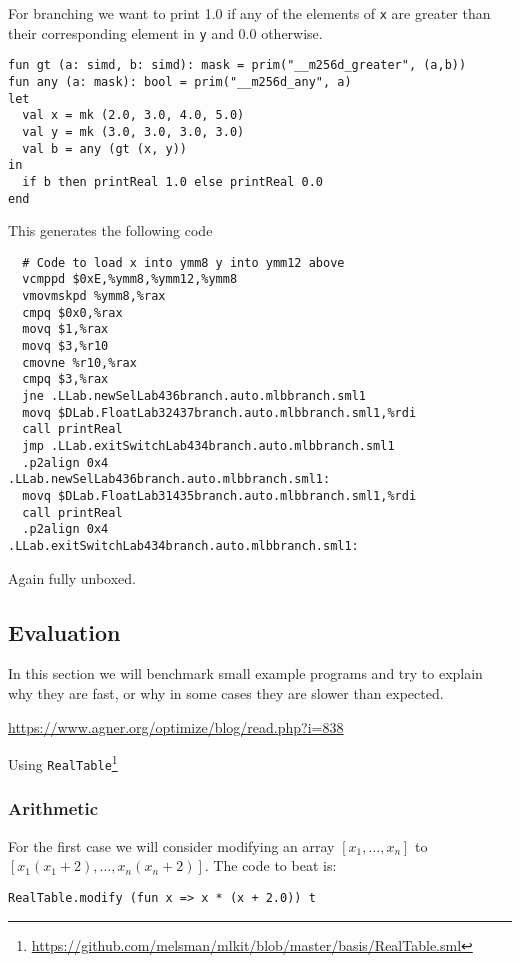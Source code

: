 \documentclass{article}
\begin{document}
For branching we want to print 1.0 if any of the elements of \verb!x! are greater than their corresponding element in \verb!y! and 0.0 otherwise.

\begin{lstlisting}
fun gt (a: simd, b: simd): mask = prim("__m256d_greater", (a,b))
fun any (a: mask): bool = prim("__m256d_any", a)
let
  val x = mk (2.0, 3.0, 4.0, 5.0)
  val y = mk (3.0, 3.0, 3.0, 3.0)
  val b = any (gt (x, y))
in 
  if b then printReal 1.0 else printReal 0.0
end
\end{lstlisting}

This generates the following code

\begin{verbatim}
  # Code to load x into ymm8 y into ymm12 above
  vcmppd $0xE,%ymm8,%ymm12,%ymm8
  vmovmskpd %ymm8,%rax
  cmpq $0x0,%rax
  movq $1,%rax
  movq $3,%r10
  cmovne %r10,%rax
  cmpq $3,%rax
  jne .LLab.newSelLab436branch.auto.mlbbranch.sml1
  movq $DLab.FloatLab32437branch.auto.mlbbranch.sml1,%rdi
  call printReal
  jmp .LLab.exitSwitchLab434branch.auto.mlbbranch.sml1
  .p2align 0x4
.LLab.newSelLab436branch.auto.mlbbranch.sml1:
  movq $DLab.FloatLab31435branch.auto.mlbbranch.sml1,%rdi
  call printReal
  .p2align 0x4
.LLab.exitSwitchLab434branch.auto.mlbbranch.sml1:
\end{verbatim}

Again fully unboxed.

\subsection{Evaluation}

In this section we will benchmark small example programs and try to explain why they are fast, or why in some cases they are slower than expected.

\url{https://www.agner.org/optimize/blog/read.php?i=838}

Using \texttt{RealTable}\footnote{\url{https://github.com/melsman/mlkit/blob/master/basis/RealTable.sml}}

\subsubsection{Arithmetic}

For the first case we will consider modifying an array $[x_1, \ldots, x_n]$ to $[x_1(x_1 + 2), \ldots, x_n(x_n + 2)]$. The code to beat is:
\begin{lstlisting}
RealTable.modify (fun x => x * (x + 2.0)) t
\end{lstlisting}
\end{document}
